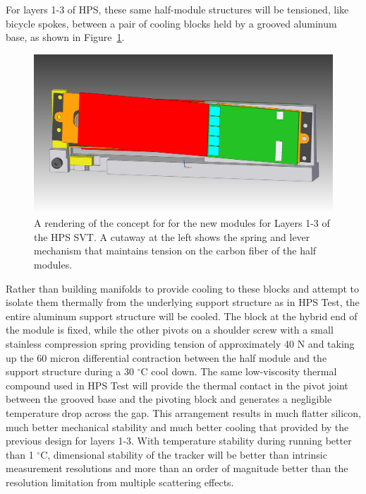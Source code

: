 For layers 1-3 of HPS, these same half-module structures will be tensioned, like bicycle spokes, between a pair of cooling blocks held by a grooved aluminum base, as shown in Figure~\ref{fig:newmodule_L1-3}. 
\begin{figure}[ht]
    \includegraphics[width=\textwidth]{svt/figures/10dec3.jpg}
\caption{\small{A rendering of the concept for for the new modules for Layers 1-3 of the HPS SVT.  A cutaway at the left shows the spring and lever mechanism that maintains tension on the carbon fiber of the half modules.} }
\label{fig:newmodule_L1-3}
\end{figure}
Rather than building manifolds to provide cooling to these blocks and attempt to isolate them thermally from the underlying support structure as in HPS Test, the entire aluminum support structure will be cooled.  The block at the hybrid end of the module is fixed, while the other pivots on a shoulder screw with a small stainless compression spring providing tension of approximately 40 N and taking up the 60 micron differential contraction between the half module and the support structure during a 30 $^\circ$C cool down. The same low-viscosity thermal compound used in HPS Test will provide the thermal contact in the pivot joint between the grooved base and the pivoting block and generates a negligible temperature drop across the gap. This arrangement results in much flatter silicon, much better mechanical stability and much better cooling that provided by the previous design for layers 1-3. With temperature stability during running better than 1 $^\circ$C, dimensional stability of the tracker will be better than intrinsic measurement resolutions and more than an order of magnitude better than the resolution limitation from multiple scattering effects.

